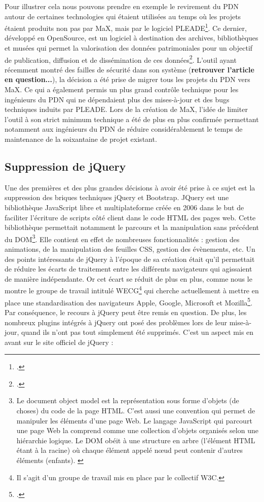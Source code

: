 \documentclass[a4paper,12pt,twoside]{book}
\begin{document}
Pour illustrer cela nous pouvons prendre en exemple le revirement du \acrshort{PDN} autour de certaines technologies qui étaient utilisées au temps où les projets étaient produits non pas par MaX, mais par le logiciel PLEADE\footcite{pleade}. Ce dernier, développé en OpenSource, est un logiciel à destination des archives, bibliothèques et musées qui permet la valorisation des données patrimoniales pour un objectif de publication, diffusion et de dissémination de ces données\footcite{pleade}. L'outil ayant récemment montré des failles de sécurité dans son système (\textbf{retrouver l'article en question...}), la décision a été prise de migrer tous les projets du \acrshort{PDN} vers MaX. Ce qui a également permis un plus grand contrôle technique pour les ingénieurs du \acrshort{PDN} qui ne dépendaient plus des mises-à-jour et des bugs techniques induits par PLEADE. Lors de la création de MaX, l'idée de limiter l'outil à son strict minimum technique a été de plus en plus confirmée permettant notamment aux ingénieurs du \acrshort{PDN} de réduire considérablement le temps de maintenance de la soixantaine de projet existant.

\subsection{Suppression de jQuery}
Une des premières et des plus grandes décisions à avoir été prise à ce sujet est la suppression des briques techniques jQuery et Bootstrap. JQuery est une bibliothèque JavaScript libre et multiplateforme créée en 2006 dans le but de faciliter l'écriture de scripts côté client dans le code \acrshort{HTML} des pages web. Cette bibliothèque permettait notamment le parcours et la manipulation sans précédent du \acrfull{DOM}\footnote{Le document object model est la représentation sous forme d'objets (de choses) du code de la page \acrshort{HTML}. C'est aussi une convention qui permet de manipuler les éléments d'une page Web. Le langage JavaScript qui parcourt une page Web la comprend comme une collection d'objets organisés selon une hiérarchie logique. Le DOM obéit à une structure en arbre (l'élément \acrshort{HTML} étant à la racine) où chaque élément appelé n\oe{}ud peut contenir d'autres éléments (enfants). \cite{dom_2020}}. Elle contient en effet de nombreuses fonctionnalités : gestion des animations, de la manipulation des feuilles CSS, gestion des évènements, etc. Un des points intéressants de jQuery à l'époque de sa création était qu'il permettait de réduire les écarts de traitement entre les différents navigateurs qui agissaient de manière indépendante. Or cet écart se réduit de plus en plus, comme nous le montre le groupe de travail intitulé
\acrfull{WECG}\footnote{Il s'agit d'un groupe de travail mis en place par le collectif W3C.} qui cherche actuellement à mettre en place une standardisation des navigateurs Apple, Google, Microsoft et Mozilla\footcite{webextensions}. Par conséquence, le recours à jQuery peut être remis en question. De plus, les nombreux plugins intégrés à jQuery ont posé des problèmes lors de leur mise-à-jour, quand ils n'ont pas tout simplement été supprimés. C'est un aspect mis en avant sur le site officiel de jQuery :
\end{document}
